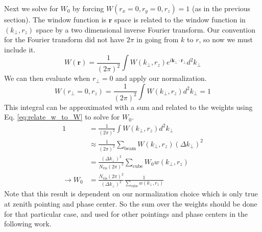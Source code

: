 \documentclass{article}
\begin{document}
Next we solve for $W_0$ by forcing $W(r_x=0,r_y=0,r_z) = 1$ (as in the previous section). The window function is $\mathbf{r}$ space is related to the window function in $(k_{\perp},r_z)$ space by a two dimensional inverse Fourier transform. Our convention for the Fourier transform did not have $2\pi$ in going from $k$ to $r$, so now we must include it.
\begin{equation}
W(\mathbf{r}) = \frac{1}{(2\pi)^2} \int W(k_{\perp},r_z) e^{i \mathbf{k}_{\perp} \cdot \mathbf{r}_{\perp}} d^2 k_{\perp}
\end{equation}
We can then evaluate when $r_{\perp}=0$ and apply our normalization.
\begin{equation}
W(r_{\perp}=0,r_z) =  \frac{1}{(2\pi)^2} \int W(k_{\perp},r_z) d^2 k_{\perp} = 1
\end{equation}
This integral can be approximated with a sum and related to the weights using Eq. \ref{eq:relate_w_to_W} to solve for $W_0$.
\begin{subequations} \label{eq:solve_W0}
\begin{align}
1 & = \frac{1}{(2\pi)^2} \int W(k_{\perp},r_z) d^2 k_{\perp} \\
& \approx  \frac{1}{(2\pi)^2} \sum_{\text{beam}} W(k_{\perp},r_z) (\Delta k_{\perp})^2 \\
& =  \frac{(\Delta k_{\perp})^2}{N_{\text{vis}}(2\pi)^2} \sum_{\text{cube}} W_0  w(k_{\perp},r_z) \\
\rightarrow W_0 & = \frac{N_{\text{vis}}(2\pi)^2}{(\Delta k_{\perp})^2} \frac{1}{\sum_{\text{cube}} w(k_{\perp},r_z)} 
\end{align}
\end{subequations}
Note that this result is dependent on our normalization choice which is only true at zenith pointing and phase center. So the sum over the weights should be done for that particular case, and used for other pointings and phase centers in the following work.
\end{document}
